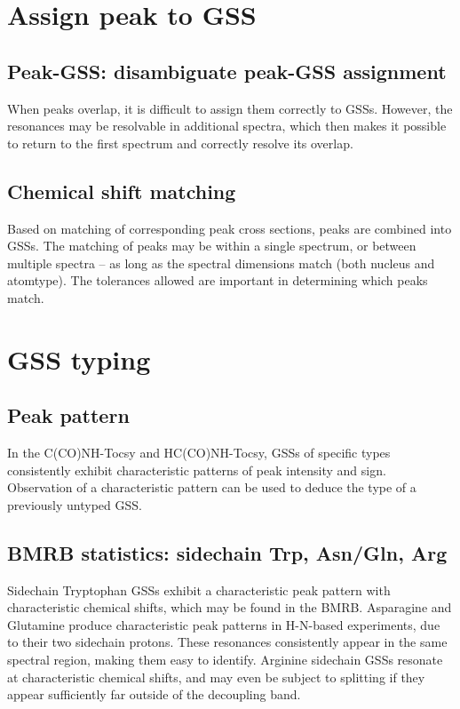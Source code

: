 \section*{Assign peak to GSS}

\subsection*{Peak-GSS: disambiguate peak-GSS assignment}
When peaks overlap, it is difficult to assign them correctly to GSSs.  However,
the resonances may be resolvable in additional spectra, which then makes it
possible to return to the first spectrum and correctly resolve its overlap.

\subsection*{Chemical shift matching}
Based on matching of corresponding peak cross sections, peaks are combined into
GSSs.  The matching of peaks may be within a single spectrum, or between 
multiple spectra -- as long as the spectral dimensions match (both nucleus
and atomtype).  The tolerances allowed are important in determining which
peaks match.



\section*{GSS typing}

\subsection*{Peak pattern}
In the C(CO)NH-Tocsy and HC(CO)NH-Tocsy, GSSs of specific types consistently
exhibit characteristic patterns of peak intensity and sign.  Observation of
a characteristic pattern can be used to deduce the type of a previously
untyped GSS.

\subsection*{BMRB statistics: sidechain Trp, Asn/Gln, Arg}
Sidechain Tryptophan GSSs exhibit a characteristic peak pattern with 
characteristic chemical shifts, which may be found in the BMRB.
Asparagine and Glutamine produce characteristic peak patterns in H-N-based 
experiments, due to their two sidechain protons.  These resonances consistently
appear in the same spectral region, making them easy to identify.
Arginine sidechain GSSs resonate at characteristic chemical shifts, and may
even be subject to splitting if they appear sufficiently far outside of the
decoupling band.

